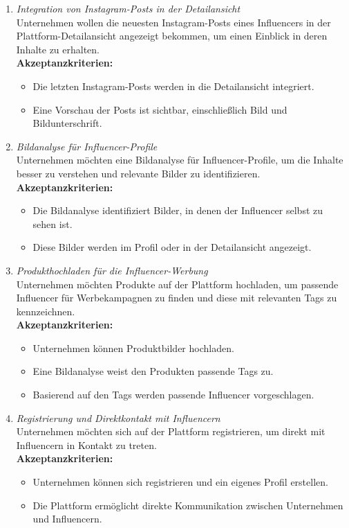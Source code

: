 \documentclass[conference,a4paper,flushend]{cs-techrep}
\begin{document}
\begin{enumerate}

\item{\textit{Integration von Instagram-Posts in der Detailansicht}}\\
Unternehmen wollen die neuesten Instagram-Posts eines Influencers in der Plattform-Detailansicht angezeigt bekommen, um einen Einblick in deren Inhalte zu erhalten.\\
\textbf{Akzeptanzkriterien:}
\begin{itemize}
\item{Die letzten Instagram-Posts werden in die Detailansicht integriert.}
\item{Eine Vorschau der Posts ist sichtbar, einschließlich Bild und Bildunterschrift.\\}
\end{itemize}

\item{\textit{Bildanalyse für Influencer-Profile}}\\
Unternehmen möchten eine Bildanalyse für Influencer-Profile, um die Inhalte besser zu verstehen und relevante Bilder zu identifizieren.\\
\textbf{Akzeptanzkriterien:}
\begin{itemize}
\item{Die Bildanalyse identifiziert Bilder, in denen der Influencer selbst zu sehen ist.}
\item{Diese Bilder werden im Profil oder in der Detailansicht angezeigt.\\}
\end{itemize}

\item{\textit{Produkthochladen für die Influencer-Werbung}}\\
Unternehmen möchten Produkte auf der Plattform hochladen, um passende Influencer für Werbekampagnen zu finden und diese mit relevanten Tags zu kennzeichnen.\\
\textbf{Akzeptanzkriterien:}
\begin{itemize}
\item{Unternehmen können Produktbilder hochladen.}
\item{Eine Bildanalyse weist den Produkten passende Tags zu.}
\item{Basierend auf den Tags werden passende Influencer vorgeschlagen.\\}
\end{itemize}

\item{\textit{Registrierung und Direktkontakt mit Influencern}}\\
Unternehmen möchten sich auf der Plattform registrieren, um direkt mit Influencern in Kontakt zu treten.\\
\textbf{Akzeptanzkriterien:}
\begin{itemize}
\item{Unternehmen können sich registrieren und ein eigenes Profil erstellen.}
\item{Die Plattform ermöglicht direkte Kommunikation zwischen Unternehmen und Influencern.\\}
\end{itemize}


\end{enumerate}
\end{document}
